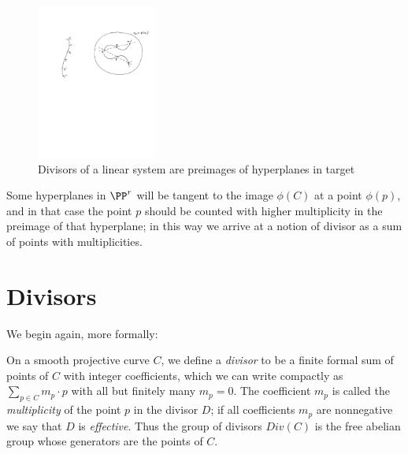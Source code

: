 \begin{figure}
 \caption{Divisors of a linear system are preimages of hyperplanes in target}
\centerline {\includegraphics[height=2in]{"Fig1.1.pdf"}}
\end{figure}

Some hyperplanes in $\PP^{r}$ will be tangent to the image $\phi(C)$ at a point $\phi(p)$, and in that case the point $p$ should be counted with higher multiplicity in the preimage of that hyperplane; in
this way we arrive at a notion of divisor as a sum of points with multiplicities.



\section{Divisors}

We  begin again, more formally:

On a smooth projective curve $C$, we define a \emph{divisor} to be a finite formal sum of points of $C$ with integer coefficients, which we can write compactly as $\sum_{p\in C} m_p\cdot p$ with all but finitely many $m_p=0$.  The coefficient $m_p$ is called the \emph{multiplicity} of the point $p$ in the divisor $D$; if all coefficients $m_p$ are nonnegative we say that $D$ is \emph{effective}. Thus the group of divisors $Div(C)$ is the free abelian group whose generators
are the points of $C$.


